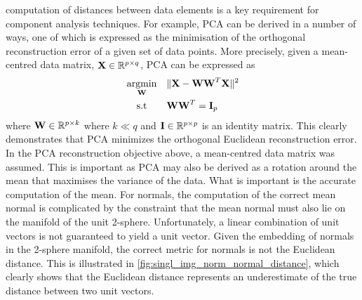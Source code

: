 computation of distances between data elements is a key requirement for
component analysis techniques. For example, PCA can be derived in a number of
ways, one of which is expressed as the minimisation of the orthogonal
reconstruction error of a given set of data points. More precisely, given
a mean-centred data matrix, $\boldsymbol{\mathbf{X}} \in \mathbb{R}^{p \times q}$, PCA can be expressed
as
\begin{equation*}
\begin{alignedat}{2}
	&\argmin_{\bb{W}} \quad &&\lVert \bb{X} - \bb{W} \bb{W}^T \bb{X} \rVert^2 \\
	&\quad \, \st      &&\bb{W} \bb{W}^T = \bb{I}_p
\end{alignedat}
\end{equation*}
where $\boldsymbol{\mathbf{W}} \in \mathbb{R}^{p \times k}$ where $k \ll q$ and
$\boldsymbol{\mathbf{I}} \in \mathbb{R}^{p \times p}$ is an identity matrix. This clearly demonstrates
that PCA minimizes the orthogonal Euclidean reconstruction error. In the PCA
reconstruction objective above, a mean-centred data matrix was assumed. This is
important as PCA may also be derived as a rotation around the mean that
maximises the variance of the data. What is important is the accurate
computation of the mean. For normals, the computation of the correct mean normal
is complicated by the constraint that the mean normal must also lie on the
manifold of the unit 2-sphere. Unfortunately, a linear combination of unit
vectors is not guaranteed to yield a unit vector. Given the embedding of normals
in the 2-sphere manifold, the correct metric for normals is not the Euclidean
distance. This is illustrated in
\cref{fig:singl_img_norm_normal_distance}, which clearly shows that the Euclidean
distance represents an underestimate of the true distance between two unit
vectors.

